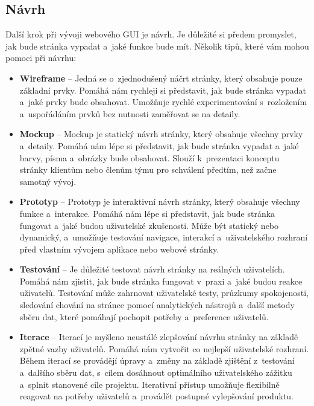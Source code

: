 \subsection{Návrh}
\label{subsec:design}

Další krok při vývoji webového GUI je návrh. Je důležité si předem promyslet, jak bude stránka vypadat a~jaké funkce bude mít. Několik tipů, které vám mohou pomoci při návrhu:

\begin{itemize}
  \item \textbf{Wireframe} -- Jedná se o~zjednodušený náčrt stránky, který obsahuje pouze základní prvky. Pomáhá nám rychleji si představit, jak bude stránka vypadat a~jaké prvky bude obsahovat. Umožňuje rychlé experimentování s~rozložením a~uspořádáním prvků bez nutnosti zaměřovat se na detaily.
  \item \textbf{Mockup} -- Mockup je statický návrh stránky, který obsahuje všechny prvky a~detaily. Pomáhá nám lépe si představit, jak bude stránka vypadat a~jaké barvy, písma a~obrázky bude obsahovat. Slouží k~prezentaci konceptu stránky klientům nebo členům týmu pro schválení předtím, než začne samotný vývoj.
  \item \textbf{Prototyp} -- Prototyp je interaktivní návrh stránky, který obsahuje všechny funkce a~interakce. Pomáhá nám lépe si představit, jak bude stránka fungovat a~jaké budou uživatelské zkušenosti. Může být statický nebo dynamický, a~umožňuje testování navigace, interakcí a~uživatelského rozhraní před vlastním vývojem aplikace nebo webové stránky.
  \item \textbf{Testování} -- Je důležité testovat návrh stránky na reálných uživatelích. Pomáhá nám zjistit, jak bude stránka fungovat v~praxi a~jaké budou reakce uživatelů. Testování může zahrnovat uživatelské testy, průzkumy spokojenosti, sledování chování na stránce pomocí analytických nástrojů a~další metody sběru dat, které pomáhají pochopit potřeby a~preference uživatelů.
  \item \textbf{Iterace} -- Iterací je myšleno neustálé zlepšování návrhu stránky na základě zpětné vazby uživatelů. Pomáhá nám vytvořit co nejlepší uživatelské rozhraní. Během iterací se provádějí úpravy a~změny na základě zjištění z~testování a~dalšího sběru dat, s~cílem dosáhnout optimálního uživatelského zážitku a~splnit stanovené cíle projektu. Iterativní přístup umožňuje flexibilně reagovat na potřeby uživatelů a~provádět postupné vylepšování produktu.
\end{itemize}

